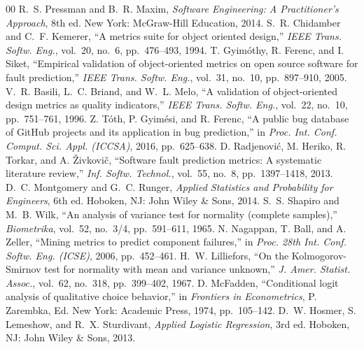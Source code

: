 \documentclass[conference]{IEEEtran}
\begin{document}
\begin{thebibliography}{00}
 R.~S. Pressman and B.~R. Maxim, \textit{Software Engineering: A Practitioner's Approach}, 8th ed. New York: McGraw-Hill Education, 2014.
 S.~R. Chidamber and C.~F. Kemerer, ``A metrics suite for object oriented design,'' \textit{IEEE Trans. Softw. Eng.}, vol.~20, no.~6, pp.~476--493, 1994.
 T. Gyim{\'o}thy, R. Ferenc, and I. Siket, ``Empirical validation of object-oriented metrics on open source software for fault prediction,'' \textit{IEEE Trans. Softw. Eng.}, vol.~31, no.~10, pp.~897--910, 2005.
 V.~R. Basili, L.~C. Briand, and W.~L. Melo, ``A validation of object-oriented design metrics as quality indicators,'' \textit{IEEE Trans. Softw. Eng.}, vol.~22, no.~10, pp.~751--761, 1996.
 Z. T{\'o}th, P. Gyim{\'e}si, and R. Ferenc, ``A public bug database of GitHub projects and its application in bug prediction,'' in \textit{Proc. Int. Conf. Comput. Sci. Appl. (ICCSA)}, 2016, pp.~625--638.
 D. Radjenovi{\'c}, M. Heriko, R. Torkar, and A. {\v{Z}}ivkovi{\v{c}}, ``Software fault prediction metrics: A systematic literature review,'' \textit{Inf. Softw. Technol.}, vol.~55, no.~8, pp.~1397--1418, 2013.
 D.~C. Montgomery and G.~C. Runger, \textit{Applied Statistics and Probability for Engineers}, 6th ed. Hoboken, NJ: John Wiley \& Sons, 2014.
 S.~S. Shapiro and M.~B. Wilk, ``An analysis of variance test for normality (complete samples),'' \textit{Biometrika}, vol.~52, no.~3/4, pp.~591--611, 1965.
 N. Nagappan, T. Ball, and A. Zeller, ``Mining metrics to predict component failures,'' in \textit{Proc. 28th Int. Conf. Softw. Eng. (ICSE)}, 2006, pp.~452--461.
 H.~W. Lilliefors, ``On the Kolmogorov-Smirnov test for normality with mean and variance unknown,'' \textit{J. Amer. Statist. Assoc.}, vol.~62, no.~318, pp.~399--402, 1967.
 D. McFadden, ``Conditional logit analysis of qualitative choice behavior,'' in \textit{Frontiers in Econometrics}, P. Zarembka, Ed. New York: Academic Press, 1974, pp.~105--142.
 D.~W. Hosmer, S. Lemeshow, and R.~X. Sturdivant, \textit{Applied Logistic Regression}, 3rd ed. Hoboken, NJ: John Wiley \& Sons, 2013.
\end{thebibliography}
\end{document}
